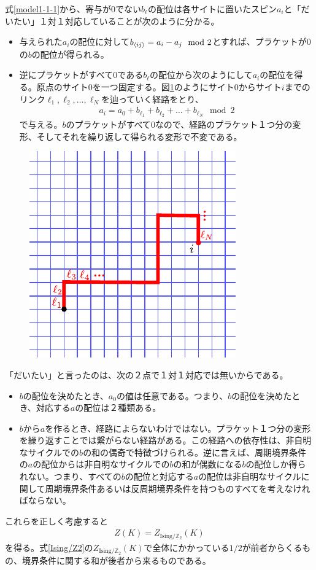 \documentclass[a4paper,12pt,dvipdfmx]{jlreq}
\newcommand{\ZGIs}{Z_{\mathrm{Ising}/\mathbb{Z}_2}}
\begin{document}
式\eqref{model1-1-1}から、寄与が$0$でない$b_{\ell}$の配位は各サイトに置いたスピン$a_{i}$と「だいたい」１対１対応していることが次のように分かる。
\begin{itemize}
  \item 与えられた$a_{i}$の配位に対して$b_{\expval{ij}}=a_i-a_j \mod 2$とすれば、プラケットが$0$の$b$の配位が得られる。
  \item 逆にプラケットがすべて$0$である$b_{\ell}$の配位から次のようにして$a_{i}$の配位を得る。原点のサイト$0$を一つ固定する。図\ref{fig:path}のようにサイト$0$からサイト$i$までのリンク$\ell_1,\ell_2,\dots,\ell_N$を辿っていく経路をとり、
  \begin{align}
    a_{i}=a_{0}+b_{\ell_1}+b_{\ell_2}+\dots+b_{\ell_N} \mod 2
  \end{align}
  で与える。$b$のプラケットがすべて$0$なので、経路のプラケット１つ分の変形、そしてそれを繰り返して得られる変形で不変である。
\end{itemize}
\begin{figure}[htbp]
  \centering
  \includegraphics{path.pdf}
  \caption{{}}
  \label{fig:path}
\end{figure}

「だいたい」と言ったのは、次の２点で１対１対応では無いからである。
\begin{itemize}
  \item $b$の配位を決めたとき、$a_0$の値は任意である。つまり、$b$の配位を決めたとき、対応する$a$の配位は２種類ある。
  \item $b$から$a$を作るとき、経路によらないわけではない。プラケット１つ分の変形を繰り返すことでは繋がらない経路がある。この経路への依存性は、非自明なサイクルでの$b$の和の偶奇で特徴づけられる。逆に言えば、周期境界条件の$a$の配位からは非自明なサイクルでの$b$の和が偶数になる$b$の配位しか得られない。つまり、すべての$b$の配位と対応する$a$の配位は非自明なサイクルに関して周期境界条件あるいは反周期境界条件を持つものすべてを考えなければならない。
\end{itemize}
これらを正しく考慮すると
\begin{align}
  Z(K)=\ZGIs(K)\label{1st}
\end{align}
を得る。式\eqref{Ising/Z2}の$\ZGIs(K)$で全体にかかっている$1/2$が前者からくるもの、境界条件に関する和が後者から来るものである。
\end{document}
